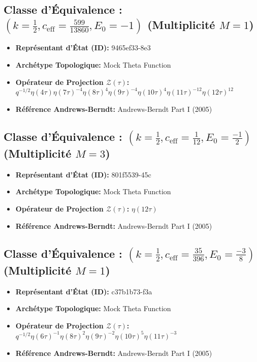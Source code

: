 \documentclass[11pt,twoside,openright]{book}
\begin{document}
\subsection*{Classe d'Équivalence : $(k=\frac{1}{2}, c_{\text{eff}}=\frac{599}{13860}, E_0=-1)$ (Multiplicité $M=1$)}
\begin{itemize}
  \item \textbf{Représentant d'État (ID):} 9465ef33-8e3
  \item \textbf{Archétype Topologique:} Mock Theta Function
  \item \textbf{Opérateur de Projection $\mathcal{Z}(\tau)$:} $q^{-1/2} \eta(4\tau) \eta(7\tau)^{-4} \eta(8\tau)^{4} \eta(9\tau)^{-4} \eta(10\tau)^{4} \eta(11\tau)^{-12} \eta(12\tau)^{12}$
  \item \textbf{Référence Andrews-Berndt:} Andrews-Berndt Part I (2005)
\end{itemize}

\subsection*{Classe d'Équivalence : $(k=\frac{1}{2}, c_{\text{eff}}=\frac{1}{12}, E_0=\frac{-1}{2})$ (Multiplicité $M=3$)}
\begin{itemize}
  \item \textbf{Représentant d'État (ID):} 801f5539-45c
  \item \textbf{Archétype Topologique:} Mock Theta Function
  \item \textbf{Opérateur de Projection $\mathcal{Z}(\tau)$:} $\eta(12\tau)$
  \item \textbf{Référence Andrews-Berndt:} Andrews-Berndt Part I (2005)
\end{itemize}

\subsection*{Classe d'Équivalence : $(k=\frac{1}{2}, c_{\text{eff}}=\frac{35}{396}, E_0=\frac{-3}{8})$ (Multiplicité $M=1$)}
\begin{itemize}
  \item \textbf{Représentant d'État (ID):} c37b1b73-f3a
  \item \textbf{Archétype Topologique:} Mock Theta Function
  \item \textbf{Opérateur de Projection $\mathcal{Z}(\tau)$:} $q^{-1/2} \eta(6\tau)^{-1} \eta(8\tau)^{2} \eta(9\tau)^{-2} \eta(10\tau)^{5} \eta(11\tau)^{-3}$
  \item \textbf{Référence Andrews-Berndt:} Andrews-Berndt Part I (2005)
\end{itemize}
\end{document}
